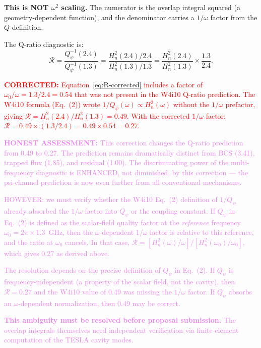 \documentclass[11pt]{article}
\newcommand{\Qpsi}{Q_\psi}
\newcommand{\Heff}{H_n}
\newcommand{\corrected}[1]{\textcolor{red}{\textbf{CORRECTED:} #1}}
\newcommand{\honest}[1]{\textcolor{violet}{\textbf{HONEST ASSESSMENT:} #1}}
\theoremstyle{definition}
\theoremstyle{remark}
\begin{document}
\textbf{This is NOT $\omega^2$ scaling.} The numerator is the
overlap integral squared (a geometry-dependent function), and the
denominator carries a $1/\omega$ factor from the $Q$-definition.

The Q-ratio diagnostic is:
\begin{equation}
\mathcal{R} = \frac{Q_\psi^{-1}(2.4)}{Q_\psi^{-1}(1.3)}
= \frac{\Heff^2(2.4)/2.4}{\Heff^2(1.3)/1.3}
= \frac{\Heff^2(2.4)}{\Heff^2(1.3)}\times\frac{1.3}{2.4}.
\label{eq:R-corrected}
\end{equation}

\corrected{Equation~\eqref{eq:R-corrected} includes a factor of
$\omega_0/\omega = 1.3/2.4 = 0.54$ that was not present in the
W4i10 Q-ratio prediction. The W4i10 formula (Eq.~(2)) wrote
$1/Q_\psi(\omega) \propto \Heff^2(\omega)$ without the $1/\omega$
prefactor, giving $\mathcal{R} = \Heff^2(2.4)/\Heff^2(1.3) = 0.49$.
With the corrected $1/\omega$ factor:
$\mathcal{R} = 0.49 \times (1.3/2.4) = 0.49 \times 0.54 = 0.27$.}

\honest{This correction changes the Q-ratio prediction from 0.49 to
0.27. The prediction remains dramatically distinct from BCS (3.41),
trapped flux (1.85), and residual (1.00). The discriminating power
of the multi-frequency diagnostic is ENHANCED, not diminished, by
this correction --- the psi-channel prediction is now even further
from all conventional mechanisms.

HOWEVER: we must verify whether the W4i10 Eq.~(2) definition of
$1/Q_\psi$ already absorbed the $1/\omega$ factor into $\Qpsi$ or
the coupling constant. If $\Qpsi$ in Eq.~(2) is defined as the
scalar-field quality factor at the \emph{reference} frequency
$\omega_0 = 2\pi \times 1.3$~GHz, then the $\omega$-dependent
$1/\omega$ factor is relative to this reference, and the ratio at
$\omega_0$ cancels. In that case, $\mathcal{R} = [\Heff^2(\omega)
/\omega] / [\Heff^2(\omega_0)/\omega_0]$, which gives 0.27 as
derived above.

The resolution depends on the precise definition of $\Qpsi$ in
Eq.~(2). If $\Qpsi$ is frequency-independent (a property of the
scalar field, not the cavity), then $\mathcal{R} = 0.27$ and the
W4i10 value of 0.49 was missing the $1/\omega$ factor. If $\Qpsi$
absorbs an $\omega$-dependent normalization, then 0.49 may be
correct.

\textbf{This ambiguity must be resolved before proposal submission.}
The overlap integrals themselves need independent verification via
finite-element computation of the TESLA cavity modes.}
\end{document}
